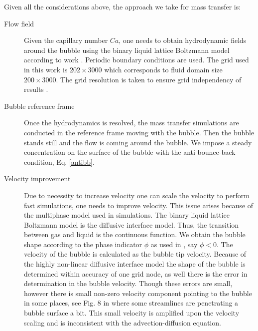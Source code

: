 \documentclass{article}
\begin{document}
Given all the considerations above, the approach we take for mass transfer is:
\begin{description}
 \item[Flow field] Given the capillary number $Ca$, one needs to obtain hydrodynamic fields around
the bubble using the binary liquid lattice Boltzmann model according to work
\cite{kuzmin-binary2d}. Periodic boundary conditions are used. The grid used in this work is
$202\times 3000$ which corresponds to fluid domain size $200\times3000$. The grid resolution is
taken to ensure grid
independency of results \cite{kuzmin-binary2d}.  
 \item[Bubble reference frame] Once the hydrodynamics is resolved, the mass transfer simulations
are conducted in the reference frame moving with the bubble. Then the bubble stands still and the
flow is coming around the
bubble. We impose a steady concentration on the surface
of the bubble with the anti bounce-back condition, Eq. \ref{antibb}.
 \item[Velocity improvement] Due to necessity to increase velocity one can scale the velocity to
perform fast simulations, one needs to improve velocity. This issue arises because of the
multiphase model used in simulations. The binary liquid lattice Boltzmann model is the diffusive
interface model. Thus, the
transition between gas and liquid is the continuous function. We obtain the bubble shape according
to the phase indicator $\phi$ as used in \cite{kuzmin-binary2d}, say $\phi<0$. The velocity of the
bubble is calculated as the bubble tip velocity. Because of the highly non-linear diffusive
interface model the shape of the bubble is determined within accuracy of one grid node, as well
there is the error in determination in the bubble velocity. Though these errors are small, however
there is small non-zero velocity component pointing to the bubble in some places, see Fig. 8 in
\cite{kuzmin-binary2d} where some streamlines are penetrating a bubble surface a bit.
This small velocity is amplified upon the velocity scaling and is inconsistent with the
advection-diffusion equation.



\end{description}
\end{document}
